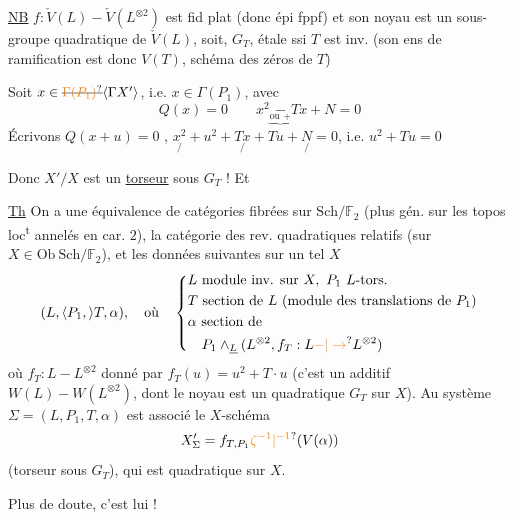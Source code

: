 \uline{NB} $f:\check V(L)\mathbin{-}\check V(L^{\otimes2})$ est fid plat (donc épi fppf) et son noyau est un sous-groupe  quadratique de $\check V(L)$, soit,  $G_T$, étale ssi $T$ est inv. (son ens de ramification est donc $V(T)$, schéma des zéros de $T$)

Soit $x\in\deleted{\unsure{\Gamma(P_1)}}\inserted{\Gamma X'}$, i.e. $x\in\Gamma(P_1)$, avec
\[
Q(x)=0\qquad x^2\underset{\underbrace{\text{ou }+}}{-}Tx+N=0
\]
Écrivons $Q(x+u)=0$ , \quad $\underset{/}{x^2}+u^2+\underset{/}{Tx}+Tu+\underset{/}{N}=0$, i.e. $u^2+Tu=0$

Donc $X'/X$ est un \uline{torseur} sous $G_T$ ! Et 

\uline{Th} On a une équivalence de catégories  fibrées sur $\mathrm{Sch}/\mathbb F_2$ (plus gén. sur les topos loc\textsuperscript{t} annelés en car. $2$),  la catégorie des rev. quadratiques relatifs (sur $X\in\mathrm{Ob}\ \mathrm{Sch}/\mathbb F_2$), et les données suivantes sur un tel $X$
\[
(L,\inserted{P_1,}T,\alpha),\quad\text{où}\quad\left\{\begin{aligned}&L\text{ module inv. sur }X,\ P_1\ L\text{-tors.}\\ &T\text{ section de }L\ \text{(module des translations de }P_1\text{)}\\ &\alpha\text{ section de}\\ &\quad P_1\wedge_{\underline L}(L^{\otimes2},f_T:L\unsure{\mathbin{-}|\to}L^{\otimes2})\end{aligned}\right.
\]
où $f_T:L\mathbin{-}L^{\otimes2}$ donné par $f_T(u)=u^2+T\cdot u$
(c'est un  additif $W(L)\mathbin{-}W(L^{\otimes2})$, dont le noyau est un    quadratique $G_T$ sur $X$).
Au système $\Sigma=(L,P_1,T,\alpha)$ est associé le $X$-schéma
\[
X'_\Sigma=f_{T,P_1}\unsure{\zeta^{-1}|{}^{-1}}(V(\alpha))
\]
(torseur sous $G_T$), qui est  quadratique sur $X$.

Plus de doute, c'est lui !

